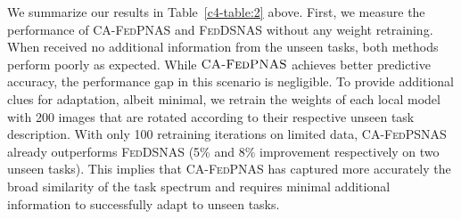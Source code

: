 \noindent We summarize our results in Table~\ref{c4-table:2} above. First, we measure the performance of \textsc{CA-FedPNAS} and \textsc{FedDSNAS} without any weight retraining. When received no additional information from the unseen tasks, both methods perform poorly as expected. While $\textsc{CA-FedPNAS}$ achieves better predictive accuracy, the performance gap in this scenario is negligible. To provide additional clues for adaptation, albeit minimal, we retrain the weights of each local model with 200  images that are rotated according to their respective unseen task description. With only 100 retraining iterations on limited data, \textsc{CA-FedPSNAS} already outperforms \textsc{FedDSNAS} (5\% and 8\% improvement respectively on two unseen tasks). This implies that \textsc{CA-FedPNAS} has captured more accurately the broad similarity of the task spectrum and requires minimal additional information to successfully adapt to unseen tasks.